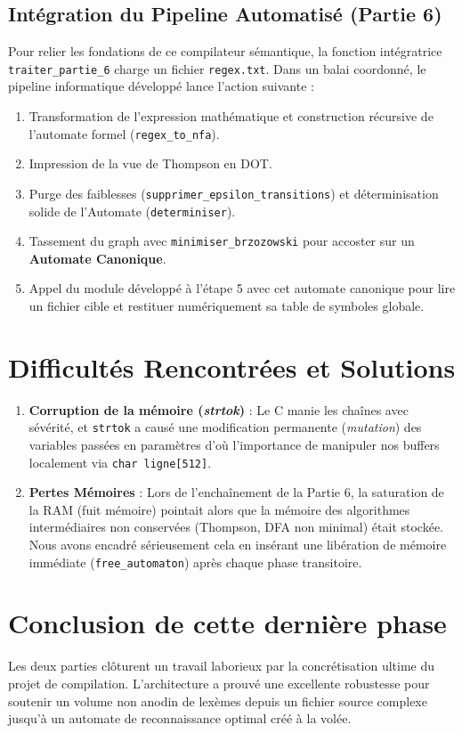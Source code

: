 \documentclass[12pt,a4paper]{article}
\begin{document}
\subsection{Intégration du Pipeline Automatisé (Partie 6)}
Pour relier les fondations de ce compilateur sémantique, la fonction intégratrice \texttt{traiter\_partie\_6} charge un fichier \texttt{regex.txt}.
Dans un balai coordonné, le pipeline informatique développé lance l'action suivante :
\begin{enumerate}
    \item Transformation de l'expression mathématique et construction récursive de l'automate formel (\texttt{regex\_to\_nfa}).
    \item Impression de la vue de Thompson en DOT.
    \item Purge des faiblesses (\texttt{supprimer\_epsilon\_transitions}) et déterminisation solide de l'Automate (\texttt{determiniser}).
    \item Tassement du graph avec \texttt{minimiser\_brzozowski} pour accoster sur un \textbf{Automate Canonique}.
    \item Appel du module développé à l'étape 5 avec cet automate canonique pour lire un fichier cible et restituer numériquement sa table de symboles globale.
\end{enumerate}

\section{Difficultés Rencontrées et Solutions}
\begin{enumerate}
    \item \textbf{Corruption de la mémoire (\textit{strtok})} : Le C manie les chaînes avec sévérité, et \texttt{strtok} a causé une modification permanente (\textit{mutation}) des variables passées en paramètres d'où l'importance de manipuler nos buffers localement via \texttt{char ligne[512]}.
    \item \textbf{Pertes Mémoires} : Lors de l'enchaînement de la Partie 6, la saturation de la RAM (fuit mémoire) pointait alors que la mémoire des algorithmes intermédiaires non conservées (Thompson, DFA non minimal) était stockée. Nous avons encadré sérieusement cela en insérant une libération de mémoire immédiate (\texttt{free\_automaton}) après chaque phase transitoire.
\end{enumerate}

\section{Conclusion de cette dernière phase}
Les deux parties clôturent un travail laborieux par la concrétisation ultime du projet de compilation. L'architecture a prouvé une excellente robustesse pour soutenir un volume non anodin de lexèmes depuis un fichier source complexe jusqu'à un automate de reconnaissance optimal créé à la volée.
\end{document}
